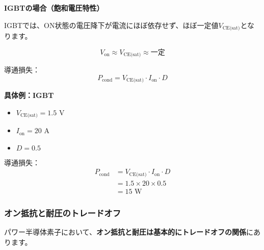 \textbf{IGBTの場合（飽和電圧特性）}

IGBTでは、ON状態の電圧降下が電流にほぼ依存せず、ほぼ一定値$V_{\text{CE(sat)}}$となります。

\begin{equation}
V_{\text{on}} \approx V_{\text{CE(sat)}} \approx \text{一定}
\end{equation}

導通損失：
\begin{equation}
\boxed{P_{\text{cond}} = V_{\text{CE(sat)}} \cdot I_{\text{on}} \cdot D}
\end{equation}

\begin{screen}
\textbf{具体例：IGBT}

\begin{itemize}
\item $V_{\text{CE(sat)}} = 1.5$ V
\item $I_{\text{on}} = 20$ A
\item $D = 0.5$
\end{itemize}

導通損失：
\begin{align}
P_{\text{cond}} &= V_{\text{CE(sat)}} \cdot I_{\text{on}} \cdot D \\
&= 1.5 \times 20 \times 0.5 \\
&= 15 \text{ W}
\end{align}
\end{screen}

\subsubsection{オン抵抗と耐圧のトレードオフ}

パワー半導体素子において、\textbf{オン抵抗と耐圧は基本的にトレードオフの関係}にあります。

